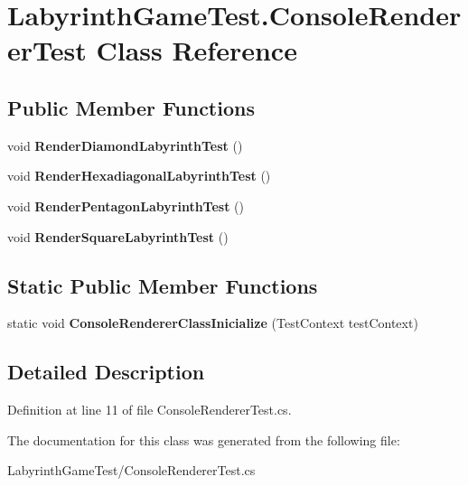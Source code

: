 \hypertarget{class_labyrinth_game_test_1_1_console_renderer_test}{\section{Labyrinth\+Game\+Test.\+Console\+Renderer\+Test Class Reference}
\label{class_labyrinth_game_test_1_1_console_renderer_test}
}
\subsection*{Public Member Functions}
\begin{DoxyCompactItemize}
\item 
\hypertarget{class_labyrinth_game_test_1_1_console_renderer_test_ad98f26fcb9e686508658c69ab32036cc}{void {\bfseries Render\+Diamond\+Labyrinth\+Test} ()}\label{class_labyrinth_game_test_1_1_console_renderer_test_ad98f26fcb9e686508658c69ab32036cc}

\item 
\hypertarget{class_labyrinth_game_test_1_1_console_renderer_test_aa29f763eeac769af7c9c5d165730e24e}{void {\bfseries Render\+Hexadiagonal\+Labyrinth\+Test} ()}\label{class_labyrinth_game_test_1_1_console_renderer_test_aa29f763eeac769af7c9c5d165730e24e}

\item 
\hypertarget{class_labyrinth_game_test_1_1_console_renderer_test_ace0b60bc7a78e61ce25b228e9fd579af}{void {\bfseries Render\+Pentagon\+Labyrinth\+Test} ()}\label{class_labyrinth_game_test_1_1_console_renderer_test_ace0b60bc7a78e61ce25b228e9fd579af}

\item 
\hypertarget{class_labyrinth_game_test_1_1_console_renderer_test_a381b5a3466c60c5c66dda0667cf65cb7}{void {\bfseries Render\+Square\+Labyrinth\+Test} ()}\label{class_labyrinth_game_test_1_1_console_renderer_test_a381b5a3466c60c5c66dda0667cf65cb7}

\end{DoxyCompactItemize}
\subsection*{Static Public Member Functions}
\begin{DoxyCompactItemize}
\item 
\hypertarget{class_labyrinth_game_test_1_1_console_renderer_test_a638c8b5ff7ebd1657ab7304a1563535c}{static void {\bfseries Console\+Renderer\+Class\+Inicialize} (Test\+Context test\+Context)}\label{class_labyrinth_game_test_1_1_console_renderer_test_a638c8b5ff7ebd1657ab7304a1563535c}

\end{DoxyCompactItemize}


\subsection{Detailed Description}


Definition at line 11 of file Console\+Renderer\+Test.\+cs.



The documentation for this class was generated from the following file\+:\begin{DoxyCompactItemize}
\item 
Labyrinth\+Game\+Test/Console\+Renderer\+Test.\+cs\end{DoxyCompactItemize}

